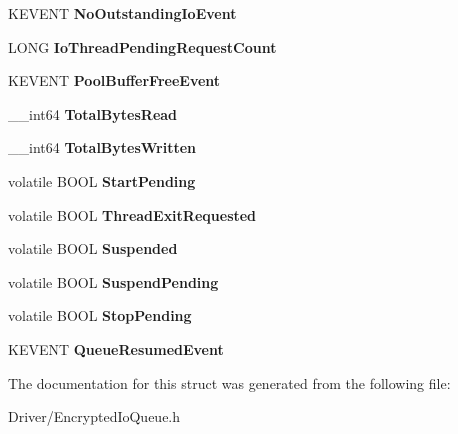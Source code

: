 \begin{DoxyCompactItemize}
\mbox{\label{struct_encrypted_io_queue_ad33dab271969045d815beda6b04fae42}} 
K\+E\+V\+E\+NT {\bfseries No\+Outstanding\+Io\+Event}
\item 
\mbox{\label{struct_encrypted_io_queue_ae4d8eed19f20be23d740d1d9d9cdc4f0}} 
L\+O\+NG {\bfseries Io\+Thread\+Pending\+Request\+Count}
\item 
\mbox{\label{struct_encrypted_io_queue_a776ed50a87bf10d617922785530cb512}} 
K\+E\+V\+E\+NT {\bfseries Pool\+Buffer\+Free\+Event}
\item 
\mbox{\label{struct_encrypted_io_queue_affd51a971b0376f3b245064e8b1ce35e}} 
\+\_\+\+\_\+int64 {\bfseries Total\+Bytes\+Read}
\item 
\mbox{\label{struct_encrypted_io_queue_a2e77b024fe5cefcaea1b6ea46a019632}} 
\+\_\+\+\_\+int64 {\bfseries Total\+Bytes\+Written}
\item 
\mbox{\label{struct_encrypted_io_queue_ae501264186a1b93d5bdef11cf554b401}} 
volatile B\+O\+OL {\bfseries Start\+Pending}
\item 
\mbox{\label{struct_encrypted_io_queue_adc179424b02925c670f50a74965d5ee6}} 
volatile B\+O\+OL {\bfseries Thread\+Exit\+Requested}
\item 
\mbox{\label{struct_encrypted_io_queue_a2513b12af6ae3887fc0cfa689a05fa91}} 
volatile B\+O\+OL {\bfseries Suspended}
\item 
\mbox{\label{struct_encrypted_io_queue_aeb41e4516c245d04ae93a05cc762d028}} 
volatile B\+O\+OL {\bfseries Suspend\+Pending}
\item 
\mbox{\label{struct_encrypted_io_queue_aa17899931bf0cb4417f449f0bcc4403b}} 
volatile B\+O\+OL {\bfseries Stop\+Pending}
\item 
\mbox{\label{struct_encrypted_io_queue_a5bb117283183d4119280c66a7b2f77b6}} 
K\+E\+V\+E\+NT {\bfseries Queue\+Resumed\+Event}
\end{DoxyCompactItemize}


The documentation for this struct was generated from the following file\+:\begin{DoxyCompactItemize}
\item 
Driver/Encrypted\+Io\+Queue.\+h\end{DoxyCompactItemize}
